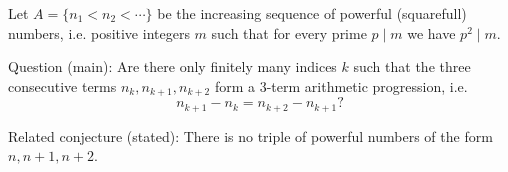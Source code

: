 Let \(A=\{n_1<n_2<\cdots\}\) be the increasing sequence of powerful (squarefull) numbers, i.e. positive integers \(m\) such that for every prime \(p\mid m\) we have \(p^2\mid m\).

Question (main): Are there only finitely many indices \(k\) such that the three consecutive terms \(n_k,n_{k+1},n_{k+2}\) form a 3-term arithmetic progression, i.e.
\[n_{k+1}-n_k = n_{k+2}-n_{k+1}?\]

Related conjecture (stated): There is no triple of powerful numbers of the form \(n,n+1,n+2\).

